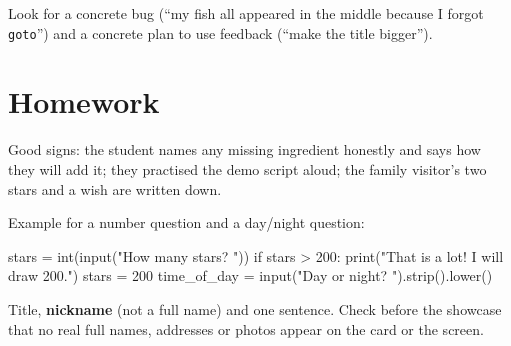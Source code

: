 \begin{answer}[Reflection]
Look for a concrete bug (\enquote{my fish all appeared in the middle because I forgot \texttt{goto}}) and a concrete plan to use feedback (\enquote{make the title bigger}).
\end{answer}

\section{Homework}
\begin{answer}
Good signs: the student names any missing ingredient honestly and says how they will add it; they practised the demo script aloud; the family visitor's two stars and a wish are written down.
\end{answer}

\begin{answer}
Example for a number question and a day/night question:
\begin{pycode}
stars = int(input("How many stars? "))
if stars > 200:
    print("That is a lot! I will draw 200.")
    stars = 200
time_of_day = input("Day or night? ").strip().lower()
\end{pycode}
\end{answer}

\begin{answer}
Title, \textbf{nickname} (not a full name) and one sentence. Check before the showcase that no real full names, addresses or photos appear on the card or the screen.
\end{answer}
